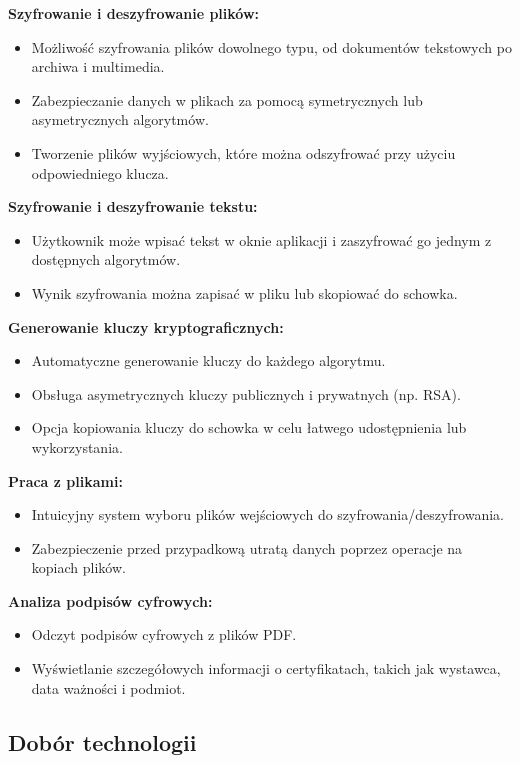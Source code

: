 \documentclass[12pt,a4paper]{article}
\begin{document}
\textbf{Szyfrowanie i deszyfrowanie plików:}
\begin{itemize}
\item Możliwość szyfrowania plików dowolnego typu, od dokumentów tekstowych po archiwa i multimedia.
\item Zabezpieczanie danych w plikach za pomocą symetrycznych lub asymetrycznych algorytmów.
\item Tworzenie plików wyjściowych, które można odszyfrować przy użyciu odpowiedniego klucza.
\end{itemize}

\textbf{Szyfrowanie i deszyfrowanie tekstu:}
\begin{itemize}
\item Użytkownik może wpisać tekst w oknie aplikacji i zaszyfrować go jednym z dostępnych algorytmów.
\item Wynik szyfrowania można zapisać w pliku lub skopiować do schowka.
\end{itemize}

\textbf{Generowanie kluczy kryptograficznych:}
\begin{itemize}
\item Automatyczne generowanie kluczy do każdego algorytmu.
\item Obsługa asymetrycznych kluczy publicznych i prywatnych (np. RSA).
\item Opcja kopiowania kluczy do schowka w celu łatwego udostępnienia lub wykorzystania.
\end{itemize}

\textbf{Praca z plikami:}
\begin{itemize}
\item Intuicyjny system wyboru plików wejściowych do szyfrowania/deszyfrowania.
\item Zabezpieczenie przed przypadkową utratą danych poprzez operacje na kopiach plików.
\end{itemize}

\textbf{Analiza podpisów cyfrowych:}
\begin{itemize}
\item Odczyt podpisów cyfrowych z plików PDF.
\item Wyświetlanie szczegółowych informacji o certyfikatach, takich jak wystawca, data ważności i podmiot.
\end{itemize}



\newpage
\subsection{Dobór technologii}
\end{document}
